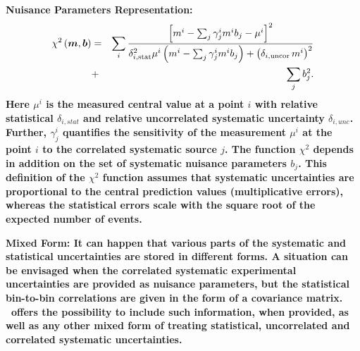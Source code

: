 \begin{description}
\item \bf{Nuisance Parameters Representation:} \rm
\label{sec:nuisance_representation}
\begin{eqnarray} 
    \chi^2\left(\boldsymbol{m},\boldsymbol{b}\right) &= &  
 \sum_i \frac{\left[m^i - \sum_j \gamma^i_j m^i b_j  - {\mu^i} \right]^2}
{ \textstyle \delta^2_{i,{\rm stat}}\mu^i \left(m^i -  \sum_j \gamma^i_j m^i b_j\right)
  + \left(\delta_{i,{\rm uncor}}\,  m^i\right)^2} \nonumber \\
  &+& \sum_j b^2_j.
\label{eq:aven}
\end{eqnarray}
%
Here ${\mu^i}$ is the  measured central value  at a point $i$ 
with  relative statistical $\delta_{i,stat}$ 
and relative uncorrelated systematic uncertainty $\delta_{i,unc}$.
Further, 
$\gamma^i_j$ 
quantifies the sensitivity of the
measurement ${\mu^i}$ at the point $i$ to the correlated systematic 
source $j$. The function $\chi^2$ depends in addition on
 the set of systematic nuisance parameters $b_j$.
This definition of the $\chi^2$ function assumes that
systematic uncertainties are proportional to the central prediction values
(multiplicative errors), whereas the statistical errors scale 
with the square root of the expected number of events. 
\item  \bf{Mixed Form:} \rm
It can happen that various parts of the systematic and statistical uncertainties are stored in different forms. A situation can be envisaged when the correlated systematic experimental uncertainties are provided as nuisance parameters, but the statistical bin-to-bin correlations are given in the form of a covariance matrix. \fitter\ offers the possibility to include such information, when provided, as well as any other mixed form of treating statistical, uncorrelated and correlated systematic uncertainties. 
\end{description}


